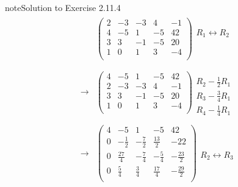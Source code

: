 \documentclass[letterpaper,10pt,english]{jupyterBook}
\begin{document}
\begin{sphinxadmonition}{note}{Solution to Exercise 2.11.4}
\begin{equation*}
\begin{split}
\begin{align*}
    & \left( \begin{array}{cccc|c} 
         2 & -3 & -3 & 4 & -1 \\ 
         4 & -5 & 1 & -5 & 42 \\ 
         3 & 3 & -1 & -5 & 20 \\ 
         1 & 0 & 1 & 3 & -4 \\ 
    \end{array} \right) 
    \begin{array}{l} \phantom{x} \\ R_{1} \leftrightarrow R_{2} \\ \\ \phantom{x} \\ \phantom{x} \end{array} \\ \\ 
    \longrightarrow 
    & \left( \begin{array}{cccc|c} 
         4 & -5 & 1 & -5 & 42 \\ 
         2 & -3 & -3 & 4 & -1 \\ 
         3 & 3 & -1 & -5 & 20 \\ 
         1 & 0 & 1 & 3 & -4 \\ 
    \end{array} \right) 
    \begin{array}{l} \phantom{x} \\ R_{2} - \frac{1}{2} R_{1} \\ R_{3} - \frac{3}{4} R_{1} \\ R_{4} - \frac{1}{4} R_{1} \end{array} \\ \\ 
    \longrightarrow 
    & \left( \begin{array}{cccc|c} 
         4 & -5 & 1 & -5 & 42 \\ 
         0 & - \frac{1}{2} & - \frac{7}{2} & \frac{13}{2} & -22 \\ 
         0 & \frac{27}{4} & - \frac{7}{4} & - \frac{5}{4} & - \frac{23}{2} \\ 
         0 & \frac{5}{4} & \frac{3}{4} & \frac{17}{4} & - \frac{29}{2} \\ 
    \end{array} \right) 
    \begin{array}{l} \phantom{x} \\ \phantom{x} \\ R_{2} \leftrightarrow R_{3} \\ \\ \phantom{x} \end{array} \\ \\ 

\end{align*}
\end{split}
\end{equation*}
\end{sphinxadmonition}
\end{document}
